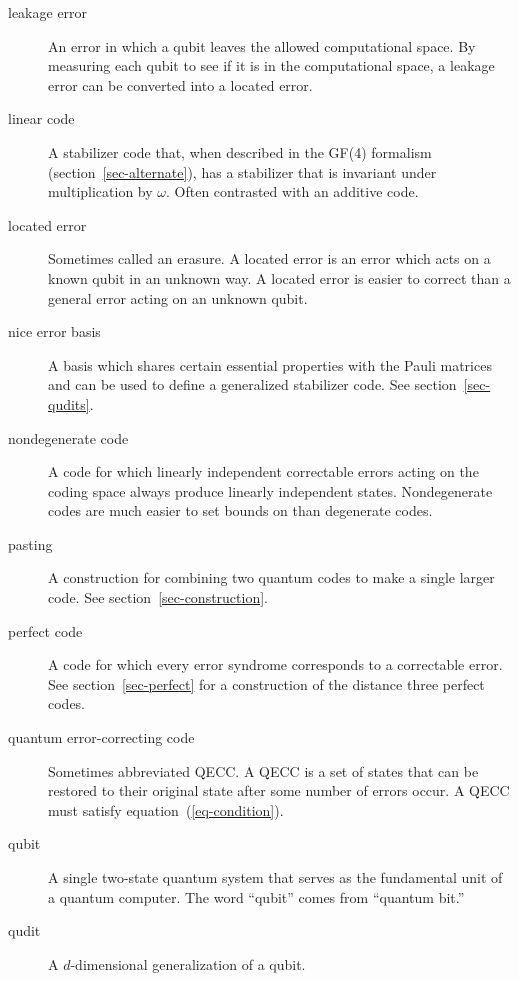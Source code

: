 \documentclass{report}
\begin{document}
\begin{description}
\item[leakage error] An error in which a qubit leaves the allowed computational
space.  By measuring each qubit to see if it is in the computational space,
a leakage error can be converted into a located error.

\item[linear code] A stabilizer code that, when described in the GF(4)
formalism (section~\ref{sec-alternate}), has a stabilizer that is invariant
under multiplication by $\omega$.  Often contrasted with an additive code.

\item[located error] Sometimes called an erasure.  A located error is an
error which acts on a known qubit in an unknown way.  A located error is
easier to correct than a general error acting on an unknown qubit.

\item[nice error basis] A basis which shares certain essential properties
with the Pauli matrices and can be used to define a generalized stabilizer
code.  See section~\ref{sec-qudits}.

\item[nondegenerate code] A code for which linearly independent correctable
errors acting on the coding space always produce linearly independent states.
Nondegenerate codes are much easier to set bounds on than degenerate codes.

\item[pasting] A construction for combining two quantum codes to make a
single larger code.  See section~\ref{sec-construction}.

\item[perfect code] A code for which every error syndrome corresponds to a
correctable error.  See section~\ref{sec-perfect} for a construction of
the distance three perfect codes.

\item[quantum error-correcting code] Sometimes abbreviated QECC.  A QECC
is a set of states that can be restored to their original state after some
number of errors occur.  A QECC must satisfy equation~(\ref{eq-condition}).

\item[qubit] A single two-state quantum system that serves as the fundamental
unit of a quantum computer.  The word ``qubit'' comes from ``quantum bit.''

\item[qudit] A $d$-dimensional generalization of a qubit.


\end{description}
\end{document}
